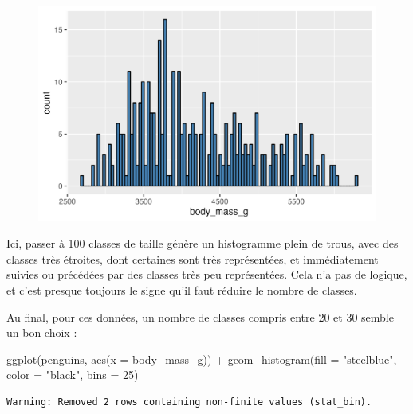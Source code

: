 \documentclass[
  letterpaper,
  DIV=11,
  numbers=noendperiod]{scrreprt}
\newenvironment{Shaded}{\begin{snugshade}}{\end{snugshade}}
\newcommand{\AttributeTok}[1]{\textcolor[rgb]{0.40,0.45,0.13}{#1}}
\newcommand{\DecValTok}[1]{\textcolor[rgb]{0.68,0.00,0.00}{#1}}
\newcommand{\FunctionTok}[1]{\textcolor[rgb]{0.28,0.35,0.67}{#1}}
\newcommand{\NormalTok}[1]{\textcolor[rgb]{0.00,0.23,0.31}{#1}}
\newcommand{\SpecialCharTok}[1]{\textcolor[rgb]{0.37,0.37,0.37}{#1}}
\newcommand{\StringTok}[1]{\textcolor[rgb]{0.13,0.47,0.30}{#1}}
\begin{document}
\begin{figure}[H]

{\centering \includegraphics{./03-visualization_files/figure-pdf/unnamed-chunk-14-1.png}

}

\end{figure}

Ici, passer à 100 classes de taille génère un histogramme plein de
trous, avec des classes très étroites, dont certaines sont très
représentées, et immédiatement suivies ou précédées par des classes très
peu représentées. Cela n'a pas de logique, et c'est presque toujours le
signe qu'il faut réduire le nombre de classes.

Au final, pour ces données, un nombre de classes compris entre 20 et 30
semble un bon choix :

\begin{Shaded}
\begin{Highlighting}[]
\FunctionTok{ggplot}\NormalTok{(penguins, }\FunctionTok{aes}\NormalTok{(}\AttributeTok{x =}\NormalTok{ body\_mass\_g)) }\SpecialCharTok{+}
  \FunctionTok{geom\_histogram}\NormalTok{(}\AttributeTok{fill =} \StringTok{"steelblue"}\NormalTok{, }\AttributeTok{color =} \StringTok{"black"}\NormalTok{,}
                 \AttributeTok{bins =} \DecValTok{25}\NormalTok{)}
\end{Highlighting}
\end{Shaded}

\begin{verbatim}
Warning: Removed 2 rows containing non-finite values (stat_bin).
\end{verbatim}
\end{document}
